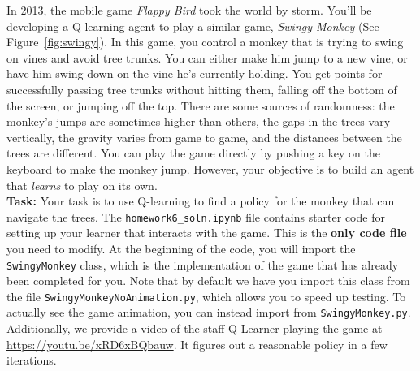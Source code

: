 \documentclass[submit]{../harvardml}
\begin{document}
\newpage





\begin{problem}
    In 2013, the mobile game \emph{Flappy Bird} took the world by storm. You'll be developing a Q-learning agent to play a similar game, \emph{Swingy Monkey} (See Figure~\ref{fig:swingy}).  In this game, you control a monkey that is trying to swing on vines and avoid tree trunks.  You can either make him jump to a new vine, or have him swing down on the vine he's currently holding.  You get points for successfully passing tree trunks without hitting them, falling off the bottom of the screen, or jumping off the top.  There are some sources of randomness: the monkey's jumps are sometimes higher than others, the gaps in the trees vary vertically, the gravity varies from game to game, and the distances between the trees are different.  You can play the game directly by pushing a key on the keyboard to make the monkey jump.  However, your objective is to build an agent that \emph{learns} to play on its own. %
    \\
  
    \noindent \textbf{Task:} Your task is to use Q-learning to find a policy for the monkey that can navigate the trees.  The \verb|homework6_soln.ipynb| file contains starter code for setting up your learner that interacts with the game. This is the \textbf{only code file} you need to modify. At the beginning of the code, you will import the \verb|SwingyMonkey| class, which is the implementation of the game that has already been completed for you. Note that by default we have you import this class from the file \verb|SwingyMonkeyNoAnimation.py|, which allows you to speed up testing. To actually see the game animation, you can instead import from \verb|SwingyMonkey.py|. Additionally, we provide a video of the staff Q-Learner playing the game at \url{https://youtu.be/xRD6xBQbauw}. It figures out a reasonable policy in a few iterations. 
    

\end{problem}
\end{document}
